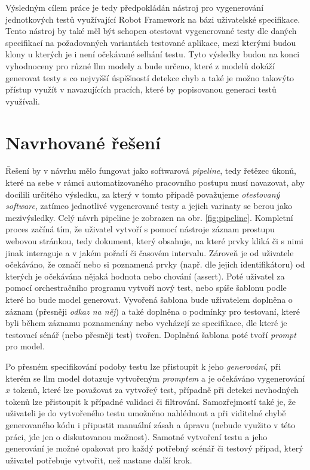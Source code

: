 \documentclass[czech, ma, kiv, he, iso690alph, pdf, viewonly]{fasthesis}
\begin{document}
        Výsledným cílem práce je tedy předpokládán nástroj pro vygenerování jednotkových testů využívající Robot Framework na bázi uživatelské specifikace. Tento nástroj by také měl být schopen otestovat vygenerované testy dle daných specifikací na požadovaných variantách testované aplikace, mezi kterými budou klony u kterých je i není očekávané selhání testu. Tyto výsledky budou na konci vyhodnoceny pro různé \Gls{llm} modely a bude určeno, které z modelů dokáží generovat testy s co nejvyšší úspěšností detekce chyb a také je možno takovýto přístup využít v navazujících pracích, které by popisovanou generaci testů využívali.

        \section{Navrhované řešení} \label{sec:proposal}

        Řešení by v návrhu mělo fungovat jako softwarová \emph{pipeline}, tedy řetězec úkonů, které na sebe v rámci automatizovaného pracovního postupu musí navazovat, aby docílili určitého výsledku, za který v tomto případě považujeme \textit{otestovaný software}, zatímco jednotlivé vygenerované testy a jejich varinaty se berou jako mezivýsledky. Celý návrh pipeline je zobrazen na obr. \ref{fig:pipeline}. Kompletní proces začíná tím, že uživatel vytvoří s pomocí nástroje záznam prostupu webovou stránkou, tedy dokument, který obsahuje, na které prvky kliká či s nimi jinak interaguje a v jakém pořadí či časovém intervalu. Zároveň je od uživatele očekáváno, že označí nebo si poznamená prvky (např. dle jejich identifikátoru) od kterých je očekávána nějaká hodnota nebo chování (assert). Poté uživatel za pomocí orchestračního programu vytvoří nový test, nebo spíše šablonu podle které ho bude model generovat. Vyvořená šablona bude uživatelem doplněna o záznam (přesněji \textit{odkaz na něj}) a také doplněna o podmínky pro testovaní, které byli během záznamu poznamenány nebo vycházejí ze specifikace, dle které je testovací sénář (nebo přesněji test) tvořen. Doplněná šablona poté tvoří \emph{prompt} pro model.

        Po přesném specifikování podoby testu lze přistoupit k jeho \emph{generování}, při kterém se \Gls{llm} model dotazuje vytvořeným \emph{promptem} a je očekáváno vygenerování \(x\) tokenů, které lze považovat za vytvořeý test, případně při detekci nevhodných tokenů lze přistoupit k případné validaci či filtrování. Samozřejmostí také je, že uživateli je do vytvořeného testu umožněno nahlédnout a při viditelné chybě generovaného kódu i připustit manuální zásah a úpravu (nebude využito v této práci, jde jen o diskutovanou možnost). Samotné vytvoření testu a jeho generování je možné opakovat pro každý potřebný scénář či testový případ, který uživatel potřebuje vytvořit, než nastane další krok.
\end{document}
